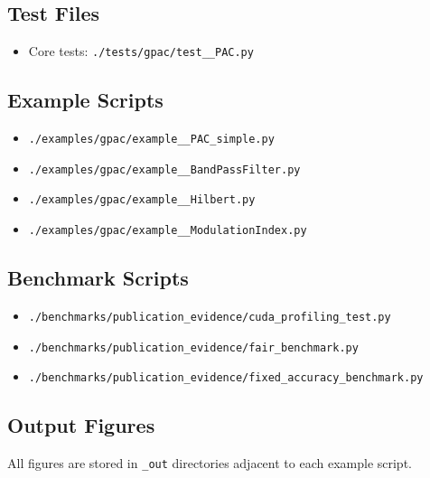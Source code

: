 \documentclass[11pt,a4paper]{article}
\begin{document}
\subsection{Test Files}
\begin{itemize}
\item Core tests: \texttt{./tests/gpac/test\_\_PAC.py}
\end{itemize}

\subsection{Example Scripts}
\begin{itemize}
\item \texttt{./examples/gpac/example\_\_PAC\_simple.py}
\item \texttt{./examples/gpac/example\_\_BandPassFilter.py}
\item \texttt{./examples/gpac/example\_\_Hilbert.py}
\item \texttt{./examples/gpac/example\_\_ModulationIndex.py}
\end{itemize}

\subsection{Benchmark Scripts}
\begin{itemize}
\item \texttt{./benchmarks/publication\_evidence/cuda\_profiling\_test.py}
\item \texttt{./benchmarks/publication\_evidence/fair\_benchmark.py}
\item \texttt{./benchmarks/publication\_evidence/fixed\_accuracy\_benchmark.py}
\end{itemize}

\subsection{Output Figures}
All figures are stored in \texttt{\_out} directories adjacent to each example script.
\end{document}
